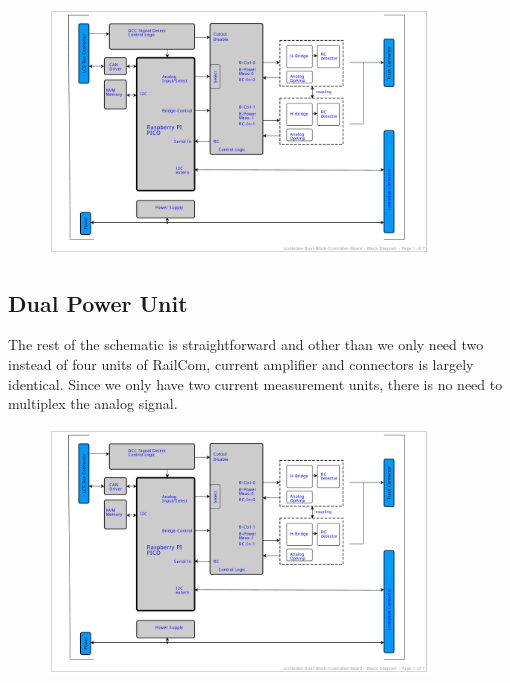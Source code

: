 \begin{figure}[htbp]
    \centering
    \includegraphics[page=4, width=0.9\textwidth]{./Schematics/Schematic_LcsNodes-Dual-Block-Controller.pdf}
\end{figure}
\FloatBarrier

\subsection{Dual Power Unit}

The rest of the schematic is straightforward and other than we only need two instead of four units of RailCom, current amplifier and connectors is largely identical. Since we only have two current measurement units, there is no need to multiplex the analog signal. 

\begin{figure}[htbp]
    \centering
    \includegraphics[page=5, width=0.9\textwidth]{./Schematics/Schematic_LcsNodes-Dual-Block-Controller.pdf}
\end{figure}
\FloatBarrier


